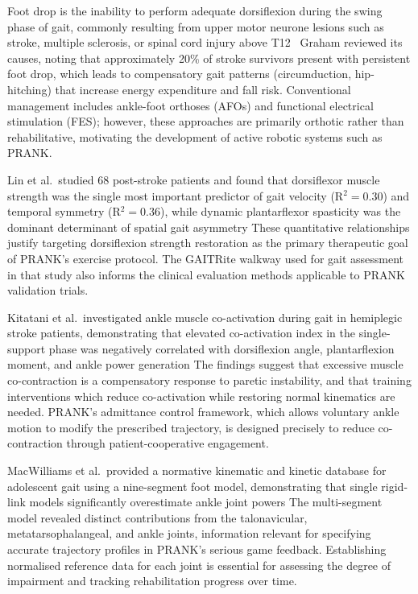 Foot drop is the inability to perform adequate dorsiflexion during the swing phase of gait, commonly resulting from upper motor neurone lesions such as stroke, multiple sclerosis, or spinal cord injury above T12~%
Graham reviewed its causes, noting that approximately 20\% of stroke survivors present with persistent foot drop, which leads to compensatory gait patterns (circumduction, hip-hitching) that increase energy expenditure and fall risk.
Conventional management includes ankle-foot orthoses (AFOs) and functional electrical stimulation (FES); however, these approaches are primarily orthotic rather than rehabilitative, motivating the development of active robotic systems such as PRANK.

Lin et al.\ studied 68 post-stroke patients and found that dorsiflexor muscle strength was the single most important predictor of gait velocity (R$^2 = 0.30$) and temporal symmetry (R$^2 = 0.36$), while dynamic plantarflexor spasticity was the dominant determinant of spatial gait asymmetry %
These quantitative relationships justify targeting dorsiflexion strength restoration as the primary therapeutic goal of PRANK's exercise protocol.
The GAITRite walkway used for gait assessment in that study also informs the clinical evaluation methods applicable to PRANK validation trials.

Kitatani et al.\ investigated ankle muscle co-activation during gait in hemiplegic stroke patients, demonstrating that elevated co-activation index in the single-support phase was negatively correlated with dorsiflexion angle, plantarflexion moment, and ankle power generation %
The findings suggest that excessive muscle co-contraction is a compensatory response to paretic instability, and that training interventions which reduce co-activation while restoring normal kinematics are needed.
PRANK's admittance control framework, which allows voluntary ankle motion to modify the prescribed trajectory, is designed precisely to reduce co-contraction through patient-cooperative engagement.

MacWilliams et al.\ provided a normative kinematic and kinetic database for adolescent gait using a nine-segment foot model, demonstrating that single rigid-link models significantly overestimate ankle joint powers %
The multi-segment model revealed distinct contributions from the talonavicular, metatarsophalangeal, and ankle joints, information relevant for specifying accurate trajectory profiles in PRANK's serious game feedback.
Establishing normalised reference data for each joint is essential for assessing the degree of impairment and tracking rehabilitation progress over time.

